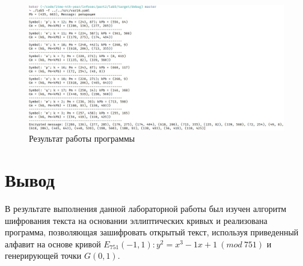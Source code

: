 \documentclass[12pt, a4paper]{article}
\begin{document}
\begin{figure}[H]
    \includegraphics[scale = 0.45]{res}
    \caption{Результат работы программы}
    \centering
\end{figure}

\section*{Вывод}

В результате выполнения данной лабораторной работы был изучен алгоритм
шифрования текста на основании эллиптических кривых и реализована
программа, позволяющая зашифровать открытый текст, используя приведенный
алфавит на основе кривой
$E_{751}(-1,1): y^2=x^3-1x+1\:(mod\:751)$ и генерирующей точки $G (0,1)$.
\end{document}
